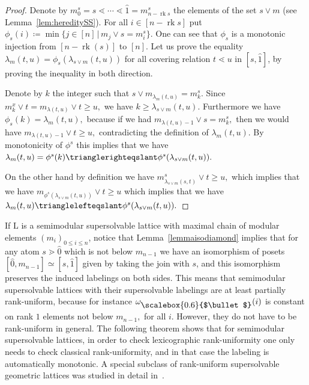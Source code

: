 \documentclass[11pt,a4paper]{amsart}
\theoremstyle{results}
\theoremstyle{definitions}
\newcommand{\rk}{\operatorname{rk}}
\newcommand{\zero}{\hat{0}}
\newcommand{\un}{\hat{1}}
\newcommand{\Latt}{\mathrm{L}}
\newcommand{\medbullet}{\mathbin{\vcenter{\hbox{\scalebox{0.6}{$\bullet$}}}}}
\renewcommand{\hat}{\widehat}
\begin{document}
\begin{proof}
Denote by $m^s_0 = s \lessdot \cdots \lessdot \un = m^s_{n- \rk s}$ the elements of the set $s\vee m$ (see Lemma~\ref{lem:hereditySS}). For all $i\in [n - \rk s]$ put $\phi_s(i) \coloneqq \min \{ j \in [n] \, | \, m_j \vee s = m^s_i\}$. One can see that $\phi_s$ is a monotonic injection from $[n - \rk(s)]$ to $[n]$. Let us prove the equality $\lambda_m(t,u) =  \phi_s(\lambda_{s\vee m}(t,u))$ for all covering relation $t \lessdot u$ in $[s, \un]$, by proving the inequality in both direction. 

Denote by $k$ the integer such that $s\vee m_{\lambda_m(t,u)} = m^s_k$. Since $m^x_k\vee t = m_{\lambda(t,u)}\vee t \geqslant u,$ we have $k \geqslant \lambda_{s\vee m}(t,u).$ Furthermore we have $\phi_s(k) = \lambda_m(t,u),$ because if we had $m_{\lambda(t,u) -1} \vee s = m^s_k,$ then  we would have $m_{\lambda(t,u)-1} \vee t \geqslant u,$ contradicting the definition of $\lambda_m(t,u).$ By monotonicity of $\phi^s$ this implies that we have $\lambda_m(t,u) = \phi^s(k) \trianglerighteqslant \phi^s( \lambda_{s\vee m}(t,u)).$ 

On the other hand by definition we have $m^s_{\lambda_{s\vee m}(s,t)}\vee t \geqslant u,$ which implies that we have $m_{\phi^s(\lambda_{s\vee m}(t,u))}\vee t \geqslant u$ which implies that we have $\lambda_m(t,u) \trianglelefteqslant \phi^s(\lambda_{s\vee m}(t,u)).$
\end{proof}

If $\Latt$ is a semimodular supersolvable lattice with maximal chain of modular elements $(m_i)_{0\leqslant i \leqslant n}$, notice that Lemma~\ref{lemmaisodiamond} implies that for any atom $s\gtrdot \zero$ which is not below $m_{n-1}$ we have an isomorphism of posets $[\zero, m_{n-1}] \simeq [s, \un]$ given by taking the join with $s$, and this isomorphism preserves the induced labelings on both sides. This means that semimodular supersolvable lattices with their supersolvable labelings are at least partially rank-uniform, because for instance $\omega_{\medbullet}(i)$ is constant on rank $1$ elements not below $m_{n-1},$ for all $i$. However, they do not have to be rank-uniform in general. The following theorem shows that for semimodular supersolvable lattices, in order to check lexicographic rank-uniformity one only needs to check classical rank-uniformity, and in that case the labeling is automatically monotonic. A special subclass of rank-uniform supersolvable geometric lattices was studied in detail in~\cite{Damiani1994}.
\end{document}
